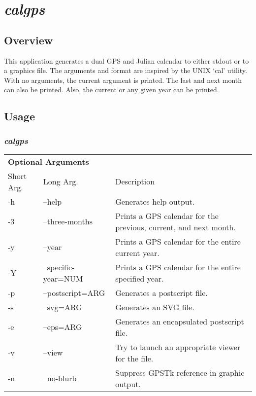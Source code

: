 %
%

\section{\emph{calgps}}
\subsection{Overview}
This application generates a dual GPS and Julian calendar to either stdout or to a graphics file. The arguments and 
format are inspired by the UNIX `cal' utility. With no arguments, the current 
argument is printed. The last and next month can also be printed. Also, the 
current or any given year can be printed.
\subsection{Usage}
\subsubsection{\emph{calgps}}
\begin{\outputsize}
\begin{longtable}{lll}
\multicolumn{3}{l}{\textbf{Optional Arguments}} \\
Short Arg. & Long Arg. & Description \\
-h & --help & Generates help output. \\ 
-3 & --three-months & Prints a GPS calendar for the previous, current, and next month. \\
-y & --year & Prints a GPS calendar for the entire current year. \\
-Y & --specific-year=NUM & Prints a GPS calendar for the entire specified year. \\
-p & --postscript=ARG  & Generates a postscript file. \\
-s & --svg=ARG & Generates an SVG file. \\
-e & --eps=ARG & Generates an encapsulated postscript file. \\
-v & --view & Try to launch an appropriate viewer for the file. \\
-n & --no-blurb & Suppress GPSTk reference in graphic output. \\

\end{longtable}
\end{\outputsize}

